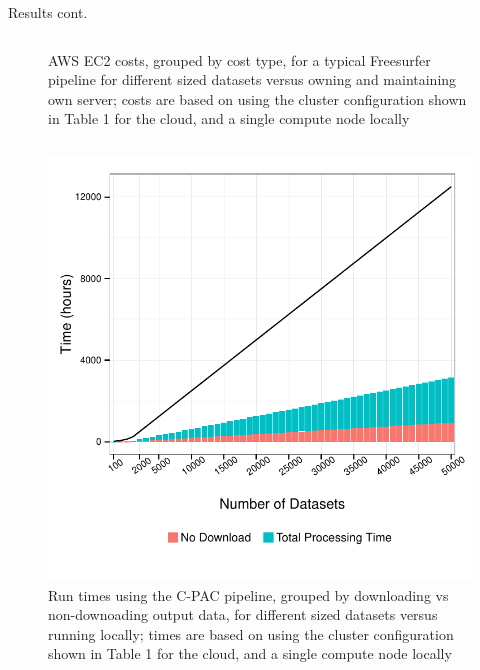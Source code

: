 \documentclass[final,hyperref={pdfpagelabels=false}]{beamer}
\begin{document}
\begin{frame}
\begin{columns}
\begin{column}{.5\textwidth}
{\begin{block}{Results cont.}
\begin{column}{.47\textwidth}
\begin{figure}
                  \caption{\label{fig:fs-costs}AWS EC2 costs, grouped by cost type, for a typical Freesurfer pipeline for different sized datasets versus owning and maintaining own server; costs are based on using the cluster configuration shown in Table 1 for the cloud, and a single compute node locally}
              \end{figure}
              \end{column}
          \begin{column}{.47\textwidth}

              \begin{figure}
                  \includegraphics[width=.99\textwidth]{cpac-times.pdf}
                  \caption{\label{fig:cpac-times}Run times using the C-PAC pipeline, grouped by downloading vs non-downoading output data, for different sized datasets versus running locally; times are based on using the cluster configuration shown in Table 1 for the cloud, and a single compute node locally}
              \end{figure}
              \begin{figure}

\end{figure}
\end{column}
\end{block}}
\end{column}
\end{columns}
\end{frame}
\end{document}
